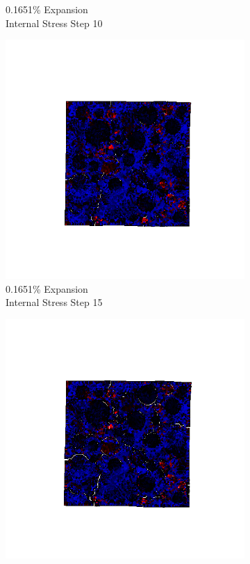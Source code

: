 \begin{figure}[ht!]
\begin{subfigure}{.25\textwidth}
      \caption{0.1651\% Expansion\\Internal Stress Step 10}
    \end{subfigure}%
    \begin{subfigure}{.25\textwidth}
      \centering
      \includegraphics[width=1.0\linewidth]{Files/exp_3D/ASR/A30P25_1_s15.png}
      \caption{0.1651\% Expansion\\Internal Stress Step 15}
    \end{subfigure}%
    \begin{subfigure}{.25\textwidth}
      \centering
      \includegraphics[width=1.0\linewidth]{Files/exp_3D/ASR/A30P25_1_stress.png}

\end{subfigure}
\end{figure}
